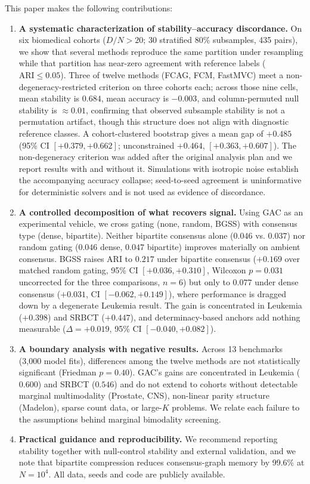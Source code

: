 \documentclass[pdflatex,sn-mathphys-num]{sn-jnl}
\theoremstyle{thmstyleone}
\theoremstyle{thmstyletwo}
\theoremstyle{thmstylethree}
\begin{document}
This paper makes the following contributions:
\begin{enumerate}
 \item \textbf{A systematic characterization of stability--accuracy discordance.} On six biomedical cohorts ($D/N > 20$; 30 stratified $80\%$ subsamples, 435 pairs), we show that several methods reproduce the same partition under resampling while that partition has near-zero agreement with reference labels ($\text{ARI} \le 0.05$). Three of twelve methods (FCAG, FCM, FastMVC) meet a non-degeneracy-restricted criterion on three cohorts each; across those nine cells, mean stability is $0.684$, mean accuracy is $-0.003$, and column-permuted null stability is $\approx 0.01$, confirming that observed subsample stability is not a permutation artifact, though this structure does not align with diagnostic reference classes. A cohort-clustered bootstrap gives a mean gap of $+0.485$ (95\% CI $[+0.379, +0.662]$; unconstrained $+0.464$, $[+0.363, +0.607]$). The non-degeneracy criterion was added after the original analysis plan and we report results with and without it. Simulations with isotropic noise establish the accompanying accuracy collapse; seed-to-seed agreement is uninformative for deterministic solvers and is not used as evidence of discordance.

 \item \textbf{A controlled decomposition of what recovers signal.} Using GAC as an experimental vehicle, we cross gating (none, random, BGSS) with consensus type (dense, bipartite). Neither bipartite consensus alone ($0.046$ vs. $0.037$) nor random gating ($0.046$ dense, $0.047$ bipartite) improves materially on ambient consensus. BGSS raises ARI to $0.217$ under bipartite consensus ($+0.169$ over matched random gating, 95\% CI $[+0.036, +0.310]$, Wilcoxon $p = 0.031$ uncorrected for the three comparisons, $n = 6$) but only to $0.077$ under dense consensus ($+0.031$, CI $[-0.062, +0.149]$), where performance is dragged down by a degenerate Leukemia result. The gain is concentrated in Leukemia ($+0.398$) and SRBCT ($+0.447$), and determinacy-based anchors add nothing measurable ($\Delta = +0.019$, 95\% CI $[-0.040, +0.082]$).

\item \textbf{A boundary analysis with negative results.} Across 13 benchmarks (3,000 model fits), differences among the twelve methods are not statistically significant (Friedman $p = 0.40$). GAC's gains are concentrated in Leukemia ($0.600$) and SRBCT ($0.546$) and do not extend to cohorts without detectable marginal multimodality (Prostate, CNS), non-linear parity structure (Madelon), sparse count data, or large-$K$ problems. We relate each failure to the assumptions behind marginal bimodality screening.

 \item \textbf{Practical guidance and reproducibility.} We recommend reporting stability together with null-control stability and external validation, and we note that bipartite compression reduces consensus-graph memory by 99.6\% at $N = 10^4$. All data, seeds and code are publicly available.
\end{enumerate}
\end{document}
